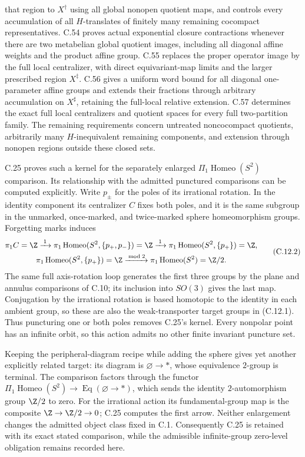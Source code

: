 that region to $X^\dagger$ using all global nonopen quotient
maps, and controls every accumulation of all $H$-translates
of finitely many remaining cocompact representatives.
C.54 proves actual exponential closure contractions whenever
there are two metabelian global quotient images, including
all diagonal affine weights and the product affine group.
C.55 replaces the proper operator image by the full local
centralizer, with direct equivariant-map limits and the
larger prescribed region $X^\ddagger$. C.56 gives a uniform
word bound for all diagonal one-parameter affine groups and
extends their fractions through arbitrary accumulation on
$X^\sharp$, retaining the full-local relative extension.
C.57 determines the exact full local centralizers and
quotient spaces for every full two-partition family.
The remaining requirements concern untreated noncocompact quotients,
arbitrarily many $H$-inequivalent remaining components, and
extension through nonopen regions outside these closed sets.

C.25 proves such a kernel for the separately enlarged
$\Pi_1\operatorname{Homeo}(S^2)$ comparison. Its relationship with the
admitted punctured comparisons can be computed explicitly. Write
$p_\pm$ for the poles of its irrational rotation. In the identity
component its centralizer $C$ fixes both poles, and it is the same
subgroup in the unmarked, once-marked, and twice-marked sphere
homeomorphism groups. Forgetting marks induces
\[
\begin{gathered}
 \pi_1C=\Z
 \xrightarrow{\;1\;}\pi_1\operatorname{Homeo}(S^2,\{p_+,p_-\})=\Z
 \xrightarrow{\;1\;}\pi_1\operatorname{Homeo}(S^2,\{p_+\})=\Z,\\
 \pi_1\operatorname{Homeo}(S^2,\{p_+\})=\Z
 \xrightarrow{\bmod 2}\pi_1\operatorname{Homeo}(S^2)=\Z/2.
\end{gathered}                                           \tag{C.12.2}
\]
The same full axis-rotation loop generates the first three groups by
the plane and annulus comparisons of C.10; its inclusion into $SO(3)$
gives the last map. Conjugation by the irrational rotation is based
homotopic to the identity in each ambient group, so these are also the
weak-transporter target groups in (C.12.1). Thus puncturing one or both
poles removes C.25's kernel. Every nonpolar point has an infinite orbit,
so this action admits no other finite invariant puncture set.

Keeping the peripheral-diagram recipe while adding the sphere gives
yet another explicitly related target: its diagram is
$\varnothing\to *$, whose equivalence $2$-group is terminal. The
comparison factors through the functor
$\Pi_1\operatorname{Homeo}(S^2)\to\operatorname{Eq}(\varnothing\to*)$,
which sends the identity $2$-automorphism group $\Z/2$ to zero. For the
irrational action its fundamental-group map is the composite
$\Z\to\Z/2\to0$; C.25 computes the first arrow. Neither enlargement
changes the admitted object class fixed in C.1. Consequently C.25 is
retained with its exact stated comparison, while the admissible
infinite-group zero-level obligation remains recorded here.

